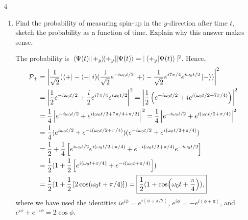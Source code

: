 \documentclass[11pt]{article}
\begin{document}
\begin{problem}{4}
\begin{enumerate}[label=(\alph*)]
\begin{answer}
\begin{equation}
\begin{aligned}
          \end{aligned}
          \end{equation}
        \end{answer}
  \item Find the probability of measuring spin-up in the \( y \)-direction after time \( t \), sketch the probability as a function of time.
        Explain why this answer makes sense.
        \begin{answer}
          The probability is \( \ev{\op{+_y}}{\Psi(t)} = |\ip{+_y}{\Psi(t)}|^2 \).
          Hence,
          \begin{equation}
          \label{eq:17}
          \begin{aligned}
            \mathcal{P}_{+} &= \left| \frac{1}{\sqrt{2}}(\bra{+} - \bra{-}i)(\frac{1}{\sqrt{2}}e^{-i\omega_0 t /2}\ket{+} - \frac{1}{\sqrt{2}}e^{i7\pi/4}e^{i\omega_0 t/2}\ket{-}) \right|^2 \\
                  &= \left| \frac{1}{2}e^{-i \omega_0 t/2} + \frac{i}{2}e^{i7\pi/4}e^{i\omega_0 t /2} \right|^2 = \left| \frac{1}{2} \left( e^{-i\omega_0 t /2} + ie^{i(\omega_0 t/2 + 7\pi /4)} \right) \right|^2 \\
                  &= \frac{1}{4} \left| e^{-i\omega_0 t /2} + e^{i(\omega_0 t /2 + 7\pi/4 + \pi /2)} \right|^2 = \frac{1}{4} \left| e^{-i\omega_0 t /2} + e^{i(\omega_0 t/2 + \pi/4)} \right|^2 \\
                  &= \frac{1}{4} (e^{i\omega_0 t /2} + e^{-i(\omega_0 t /2 + \pi/4)})(e^{-i\omega_0 t /2} + e^{i(\omega_0 t /2 + \pi/4)}) \\
                  &= \frac{1}{2} + \frac{1}{4} \left[ e^{i\omega_0 t /2}e^{i(\omega_0 t /2 + \pi/4)} + e^{-i(\omega_0 t /2 + \pi/4)}e^{-i\omega_0 t /2} \right] \\
                  &= \frac{1}{2}(1 + \frac{1}{2} \left[ e^{i(\omega_0 t + \pi/4)} + e^{-i(\omega_0 t + \pi/4)} \right]) \\
                  &= \frac{1}{2}(1 + \frac{1}{2} \left[ 2\cos(\omega_0 t + \pi/4) \right]) = \boxed{\frac{1}{2}(1 + \cos(\omega_0t + \frac{\pi}{4})),}
          \end{aligned}
        \end{equation}
        where we have used the identities \( ie^{i\phi} = e^{i(\phi + \pi/2)} \), \( e^{i\phi} = -e^{i(\phi + \pi)} \), and \( e^{i\phi} + e^{-i\phi} = 2\cos\phi \).


\end{answer}
\end{enumerate}
\end{problem}
\end{document}
